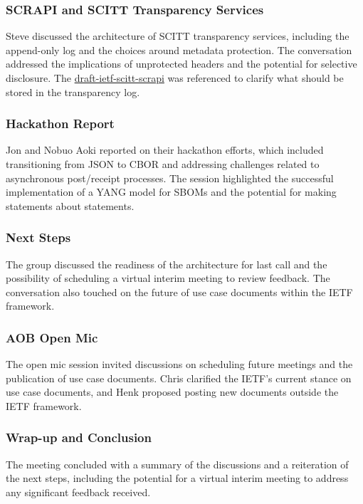 \documentclass{article}
\begin{document}
\subsubsection{SCRAPI and SCITT Transparency Services}
Steve discussed the architecture of SCITT transparency services, including the append-only log and the choices around metadata protection. The conversation addressed the implications of unprotected headers and the potential for selective disclosure. The \href{https://datatracker.ietf.org/doc/html/draft-ietf-scitt-scrapi}{draft-ietf-scitt-scrapi} was referenced to clarify what should be stored in the transparency log.

\subsubsection{Hackathon Report}
Jon and Nobuo Aoki reported on their hackathon efforts, which included transitioning from JSON to CBOR and addressing challenges related to asynchronous post/receipt processes. The session highlighted the successful implementation of a YANG model for SBOMs and the potential for making statements about statements.

\subsubsection{Next Steps}
The group discussed the readiness of the architecture for last call and the possibility of scheduling a virtual interim meeting to review feedback. The conversation also touched on the future of use case documents within the IETF framework.

\subsubsection{AOB Open Mic}
The open mic session invited discussions on scheduling future meetings and the publication of use case documents. Chris clarified the IETF's current stance on use case documents, and Henk proposed posting new documents outside the IETF framework.

\subsubsection{Wrap-up and Conclusion}
The meeting concluded with a summary of the discussions and a reiteration of the next steps, including the potential for a virtual interim meeting to address any significant feedback received.
\end{document}

